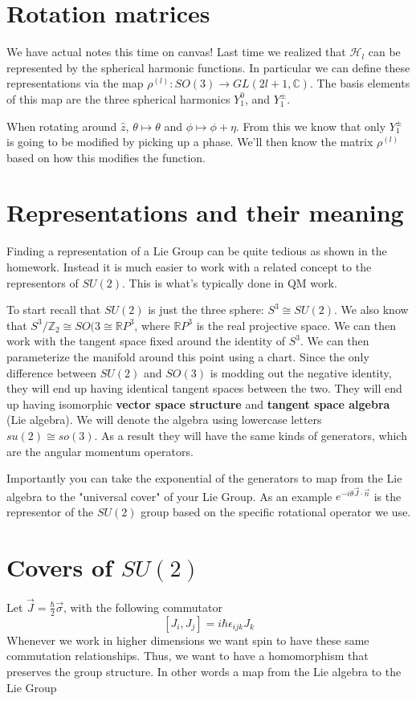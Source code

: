 \section{Rotation matrices}
We have actual notes this time on canvas! Last time we realized that $\mathcal{H}_l$
can be represented by the spherical harmonic functions. In particular we can define
these representations via the map $\rho^{\left(l\right)}: SO(3) \rightarrow GL(2l+1, \mathbb{C})$.
The basis elements of this map are the three spherical harmonics
$Y_1^0$, and $Y_1^\pm$.

When rotating around $\hat{z}$, $\theta \mapsto \theta$ and $\phi \mapsto \phi + \eta$.
From this we know that only $Y_1^\pm$ is going to be modified by picking up a phase.
We'll then know the matrix $\rho^{(l)}$ based on how this modifies the function.

\section{Representations and their meaning}
Finding a representation of a Lie Group can be quite tedious as shown in the homework.
Instead it is much easier to work with a related concept to the representors of
$SU(2)$. This is what's typically done in QM work.

To start recall that $SU(2)$ is just the three sphere: $S^3 \cong SU(2)$. We also
know that $S^3 /\mathbb{Z}_2 \cong SO(3 \cong \mathbb{R} P^3$, where
$\mathbb{R} P^3$ is the real projective space. We can then work with the tangent
space fixed around the identity of $S^3$. We can then parameterize the manifold
around this point using a chart. Since the only difference between
$SU(2)$ and $SO(3)$ is modding out the negative identity, they will end up
having identical tangent spaces between the two. They will end up having isomorphic
\textbf{vector space structure} and \textbf{tangent space algebra}
(Lie algebra). We will denote the algebra using lowercase letters $su(2) \cong so(3)$.
As a result they will have the same kinds of generators, which are the angular momentum
operators.

Importantly you can take the exponential of the generators to map from the Lie algebra
to the "universal cover" of your Lie Group. As an example
$e^{-i \theta \vec{J}\cdot\vec{n}}$ is the representor of the $SU(2)$ group based
on the specific rotational operator we use. 

\section{Covers of $SU(2)$}
Let $\vec{J} = \frac{\hbar}{2} \vec{\sigma}$, with the following
commutator
$$
    \left[J_i, J_j\right] = i \hbar \epsilon_{ijk} J_k
$$
Whenever we work in higher dimensions we want spin to have these
same commutation relationships. Thus, we want to have a homomorphism
that preserves the group structure. In other words a map from the Lie
algebra to the Lie Group

